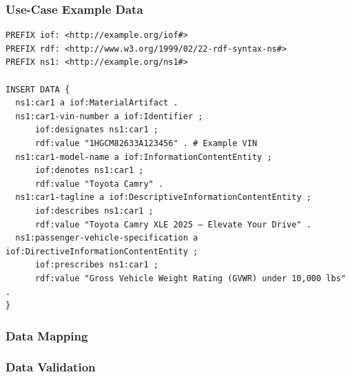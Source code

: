 \subsubsection*{Use-Case Example Data}

\begin{verbatim}
PREFIX iof: <http://example.org/iof#>
PREFIX rdf: <http://www.w3.org/1999/02/22-rdf-syntax-ns#>
PREFIX ns1: <http://example.org/ns1#>

INSERT DATA {
  ns1:car1 a iof:MaterialArtifact .
  ns1:car1-vin-number a iof:Identifier ;
      iof:designates ns1:car1 ;
      rdf:value "1HGCM82633A123456" . # Example VIN
  ns1:car1-model-name a iof:InformationContentEntity ;
      iof:denotes ns1:car1 ;
      rdf:value "Toyota Camry" .
  ns1:car1-tagline a iof:DescriptiveInformationContentEntity ;
      iof:describes ns1:car1 ;
      rdf:value "Toyota Camry XLE 2025 – Elevate Your Drive" .
  ns1:passenger-vehicle-specification a iof:DirectiveInformationContentEntity ;
      iof:prescribes ns1:car1 ;
      rdf:value "Gross Vehicle Weight Rating (GVWR) under 10,000 lbs" .
}    
\end{verbatim}


\subsubsection*{Data Mapping}


\subsubsection*{Data Validation}
